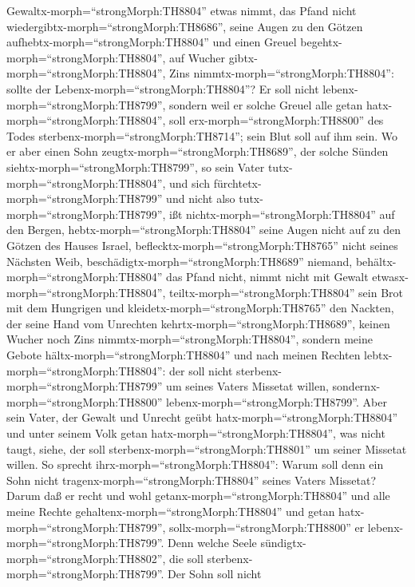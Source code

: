 Gewaltx-morph=``strongMorph:TH8804'' etwas nimmt, das Pfand nicht
wiedergibtx-morph=``strongMorph:TH8686'', seine Augen zu den Götzen
aufhebtx-morph=``strongMorph:TH8804'' und einen Greuel
begehtx-morph=``strongMorph:TH8804'',  auf Wucher
gibtx-morph=``strongMorph:TH8804'', Zins
nimmtx-morph=``strongMorph:TH8804'': sollte der
Lebenx-morph=``strongMorph:TH8804''? Er soll nicht
lebenx-morph=``strongMorph:TH8799'', sondern weil er solche Greuel alle
getan hatx-morph=``strongMorph:TH8804'', soll
erx-morph=``strongMorph:TH8800'' des Todes
sterbenx-morph=``strongMorph:TH8714''; sein Blut soll auf ihm sein.
 Wo er aber einen Sohn zeugtx-morph=``strongMorph:TH8689'',
der solche Sünden siehtx-morph=``strongMorph:TH8799'', so sein Vater
tutx-morph=``strongMorph:TH8804'', und sich
fürchtetx-morph=``strongMorph:TH8799'' und nicht also
tutx-morph=``strongMorph:TH8799'',  ißt
nichtx-morph=``strongMorph:TH8804'' auf den Bergen,
hebtx-morph=``strongMorph:TH8804'' seine Augen nicht auf zu den Götzen
des Hauses Israel, beflecktx-morph=``strongMorph:TH8765'' nicht seines
Nächsten Weib,  beschädigtx-morph=``strongMorph:TH8689''
niemand, behältx-morph=``strongMorph:TH8804'' das Pfand nicht, nimmt
nicht mit Gewalt etwasx-morph=``strongMorph:TH8804'',
teiltx-morph=``strongMorph:TH8804'' sein Brot mit dem Hungrigen und
kleidetx-morph=``strongMorph:TH8765'' den Nackten,  der
seine Hand vom Unrechten kehrtx-morph=``strongMorph:TH8689'', keinen
Wucher noch Zins nimmtx-morph=``strongMorph:TH8804'', sondern meine
Gebote hältx-morph=``strongMorph:TH8804'' und nach meinen Rechten
lebtx-morph=``strongMorph:TH8804'': der soll nicht
sterbenx-morph=``strongMorph:TH8799'' um seines Vaters Missetat willen,
sondernx-morph=``strongMorph:TH8800''
lebenx-morph=``strongMorph:TH8799''.  Aber sein Vater, der
Gewalt und Unrecht geübt hatx-morph=``strongMorph:TH8804'' und unter
seinem Volk getan hatx-morph=``strongMorph:TH8804'', was nicht taugt,
siehe, der soll sterbenx-morph=``strongMorph:TH8801'' um seiner Missetat
willen.  So sprecht ihrx-morph=``strongMorph:TH8804'':
Warum soll denn ein Sohn nicht tragenx-morph=``strongMorph:TH8804''
seines Vaters Missetat? Darum daß er recht und wohl
getanx-morph=``strongMorph:TH8804'' und alle meine Rechte
gehaltenx-morph=``strongMorph:TH8804'' und getan
hatx-morph=``strongMorph:TH8799'', sollx-morph=``strongMorph:TH8800'' er
lebenx-morph=``strongMorph:TH8799''.  Denn welche Seele
sündigtx-morph=``strongMorph:TH8802'', die soll
sterbenx-morph=``strongMorph:TH8799''. Der Sohn soll nicht
